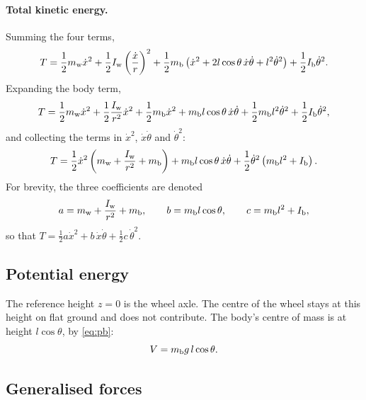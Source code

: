 \paragraph{Total kinetic energy.}
Summing the four terms,
\begin{equation}
  T = \frac12m_{\mathrm w}\dot x^2 + \frac12I_{\mathrm w}\left(\frac{\dot x}{r}\right)^2
      + \frac12m_{\mathrm b}\left(\dot x^2 + 2l\cos\theta\,\dot x\dot\theta + l^2\dot\theta^2\right)
      + \frac12I_{\mathrm b}\dot\theta^2 .
\end{equation}
Expanding the body term,
\begin{equation}
  T = \frac12m_{\mathrm w}\dot x^2 + \frac12\frac{I_{\mathrm w}}{r^2}\dot x^2 + \frac12m_{\mathrm b}\dot x^2
      + m_{\mathrm b} l\cos\theta\,\dot x\dot\theta + \frac12m_{\mathrm b} l^2\dot\theta^2 + \frac12I_{\mathrm b}\dot\theta^2 ,
\end{equation}
and collecting the terms in $\dot x^2$, $\dot x\dot\theta$ and $\dot\theta^2$:
\begin{equation}
  T = \frac12\dot x^2\left(m_{\mathrm w} + \frac{I_{\mathrm w}}{r^2} + m_{\mathrm b}\right)
      + m_{\mathrm b} l\cos\theta\,\dot x\dot\theta
      + \frac12\dot\theta^2\left(m_{\mathrm b} l^2 + I_{\mathrm b}\right).
  \label{eq:T}
\end{equation}
For brevity, the three coefficients are denoted
\begin{equation}
  a = m_{\mathrm w} + \frac{I_{\mathrm w}}{r^2} + m_{\mathrm b} , \qquad
  b = m_{\mathrm b} l\cos\theta , \qquad
  c = m_{\mathrm b} l^2 + I_{\mathrm b} ,
  \label{eq:abc}
\end{equation}
so that $T = \frac12 a\dot x^2 + b\,\dot x\dot\theta + \frac12 c\,\dot\theta^2$.

\subsection{Potential energy}

The reference height $z=0$ is the wheel axle. The centre of the wheel stays at
this height on flat ground and does not contribute. The body's centre of mass
is at height $l\cos\theta$, by \cref{eq:pb}:
\begin{equation}
  V = m_{\mathrm b} g\,l\cos\theta .
  \label{eq:V}
\end{equation}

\subsection{Generalised forces}


